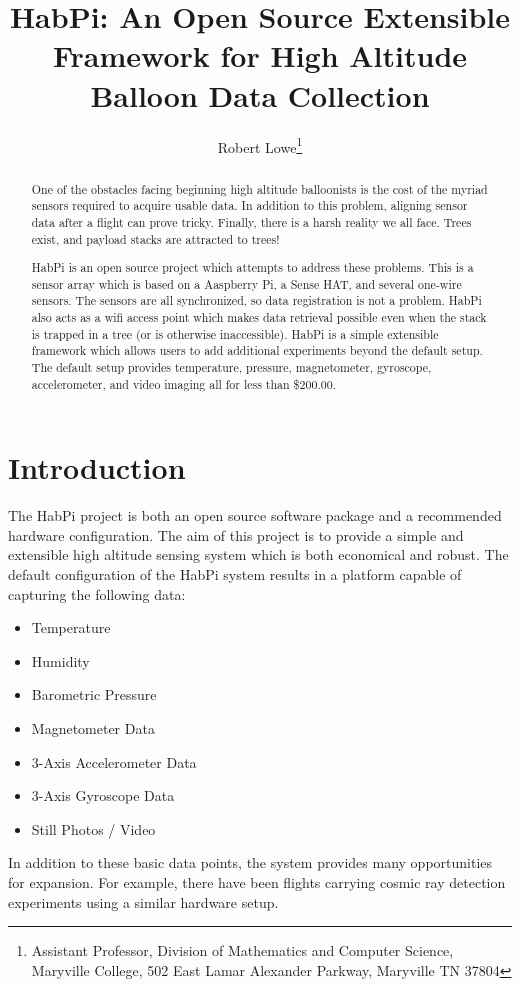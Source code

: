 \documentclass[journal]{new-aiaa}
\title{HabPi: An Open Source Extensible Framework for High Altitude
Balloon Data Collection}
\author{Robert Lowe\footnote{Assistant Professor, Division of
Mathematics and Computer Science, Maryville College, 502 East Lamar
Alexander Parkway, Maryville TN 37804}}
\affil{Maryville College}
\begin{document}
\maketitle

\begin{abstract}
One of the obstacles facing beginning high altitude balloonists
is the cost of the myriad sensors required to acquire usable data.
In addition to this problem, aligning sensor data after a flight can
prove tricky.  Finally, there is a harsh reality we all face.  Trees
exist, and payload stacks are attracted to trees!

HabPi is an open source project which attempts to address these
problems.  This is a sensor array which is based on a Aaspberry Pi,
a Sense HAT, and several one-wire sensors.  The sensors are all
synchronized, so data registration is not a problem.  HabPi also acts
as a wifi access point which makes data retrieval possible even when
the stack is trapped in a tree (or is otherwise inaccessible).  HabPi
is a simple extensible framework which allows users to add additional
experiments beyond the default setup.  The default setup provides
temperature, pressure, magnetometer, gyroscope, accelerometer, and
video imaging all for less than \$200.00.
\end{abstract}

\section{Introduction}
The HabPi project is both an open source software package and
a recommended hardware configuration.  The aim of this project is to
provide a simple and extensible high altitude sensing system which is
both economical and robust. The default configuration of the HabPi
system results in a platform capable of capturing the following data:
\begin{itemize}
    \item Temperature
    \item Humidity
    \item Barometric Pressure
    \item Magnetometer Data
    \item 3-Axis Accelerometer Data
    \item 3-Axis Gyroscope Data
    \item Still Photos / Video
\end{itemize}
In addition to these basic data points, the system provides many
opportunities for expansion.  For example, there have been flights
carrying cosmic ray detection experiments using a similar hardware
setup.  
\end{document}
